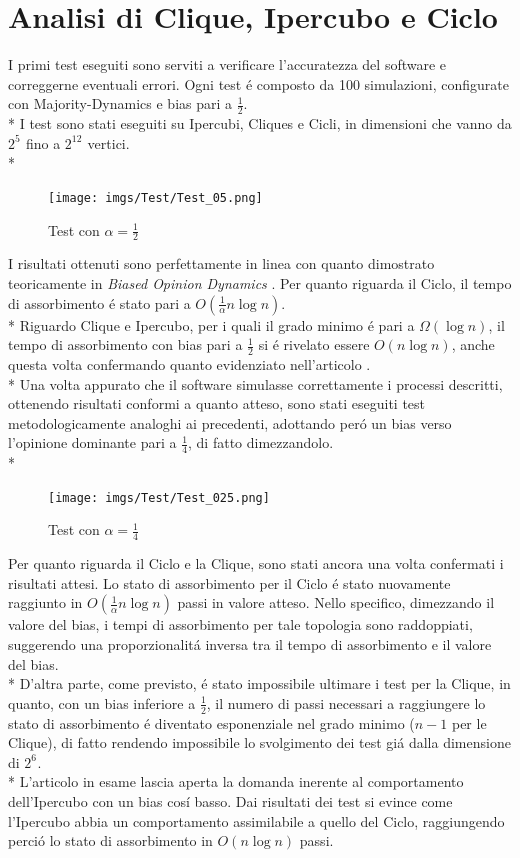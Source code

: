 \documentclass[../Tesi.tex]{subfiles}
\begin{document}
\section{Analisi di Clique, Ipercubo e Ciclo}
I primi test eseguiti sono serviti a verificare l'accuratezza del software e correggerne eventuali errori. Ogni test \'e composto da 100 simulazioni, configurate con Majority-Dynamics e bias pari a $\frac{1}{2}$.\\*
I test sono stati eseguiti su Ipercubi, Cliques e Cicli, in dimensioni che vanno da $2^{5^{\mathrm{}}}$ fino a $2^{12^{\mathrm{}}}$ vertici.\\*
\begin{figure}[H]
    \centering
    \texttt{[image: imgs/Test/Test\_05.png]}
    \caption*{Test con $\alpha = \frac{1}{2}$}
\end{figure}
I risultati ottenuti sono perfettamente in linea con quanto dimostrato teoricamente in \emph{Biased Opinion Dynamics} \cite{DBLP:journals/corr/abs-2008-13589}. Per quanto riguarda il Ciclo, il tempo di assorbimento \'e stato pari a $O(\frac{1}{\alpha}n\log{}n)$. \\*
Riguardo Clique e Ipercubo, per i quali il grado minimo \'e pari a $\Omega(\log{}n)$, il tempo di assorbimento con bias pari a $\frac{1}{2}$ si \'e rivelato essere $O(n\log{}n)$, anche questa volta confermando quanto evidenziato nell'articolo \cite{DBLP:journals/corr/abs-2008-13589}.\\*
Una volta appurato che il software simulasse correttamente i processi descritti, ottenendo risultati conformi a quanto atteso, sono stati eseguiti test metodologicamente analoghi ai precedenti, adottando per\'o un bias verso l'opinione dominante pari a $\frac{1}{4}$, di fatto dimezzandolo.\\*
\begin{figure}[H]
    \centering
    \texttt{[image: imgs/Test/Test\_025.png]}
    \caption*{Test con $\alpha = \frac{1}{4}$}
\end{figure}
Per quanto riguarda il Ciclo e la Clique, sono stati ancora una volta confermati i risultati attesi.
Lo stato di assorbimento per il Ciclo \'e stato nuovamente raggiunto in $O(\frac{1}{\alpha}n\log{}n)$ passi in valore atteso. Nello specifico, dimezzando il valore del bias, i tempi di assorbimento per tale topologia sono raddoppiati, suggerendo una proporzionalit\'a inversa tra il tempo di assorbimento e il valore del bias.\\*
D'altra parte, come previsto, \'e stato impossibile ultimare i test per la Clique, in quanto, con un bias inferiore a $\frac{1}{2}$, il numero di passi necessari a raggiungere lo stato di assorbimento \'e diventato esponenziale nel grado minimo ($n-1$ per le Clique), di fatto rendendo impossibile lo svolgimento dei test gi\'a dalla dimensione di $2^{6^{\mathrm{}}}$.\\*
L'articolo in esame \cite{DBLP:journals/corr/abs-2008-13589} lascia aperta la domanda inerente al comportamento dell'Ipercubo con un bias cos\'i basso. Dai risultati dei test si evince come l'Ipercubo abbia un comportamento assimilabile a quello del Ciclo, raggiungendo perci\'o lo stato di assorbimento in $O(n\log{}n)$ passi.
\end{document}
